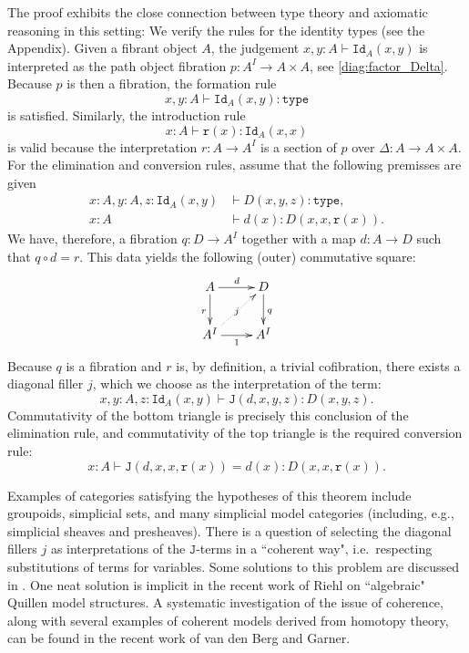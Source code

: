 \documentclass[reqno,12pt]{amsart}
\renewcommand{\to}{\rightarrow}
\newcommand{\type}{\texttt{type}}
\newcommand{\id}[1]{\texttt{Id}_{#1}}
\theoremstyle{definition}
\theoremstyle{remark}
\begin{document}
The proof exhibits the close connection between type theory and axiomatic reasoning in this setting: We verify the rules for the identity types (see the Appendix). Given a fibrant object $A$, the judgement $x, y : A\vdash \id{A}(x, y)$ is interpreted as the path object fibration $p : A^I \to A\times A$, see \eqref{diag:factor_Delta}. Because $p$ is then a fibration, the formation rule
\[
x, y : A\vdash \id{A}(x, y):\type
\]
is satisfied. Similarly, the introduction rule
\[
x:A \vdash \mathtt{r}(x):\id{A}(x,x)
\]
is valid because the interpretation $r : A\to A^I$ is a section of $p$ over $\Delta:A\to A\times A$. For the elimination and conversion rules, assume that the following premisses are given 
\begin{align*}
x : A, y : A, z : \id{A}(x, y) &\vdash D(x, y, z ) : \type , \\
x : A &\vdash d(x) : D(x, x, \mathtt{r}(x)) .
\end{align*}
We have, therefore, a fibration $q : D\to A^I$ together with a map $d : A\to D$ such that 
$q\circ d = r$. This data yields the following (outer) commutative square: 
\[  
\xymatrix{
   A   
    \ar[r]^{d}
    \ar[d]_{r}
    &
   D
    \ar[d]^{q}
    \\
    A^I 
    \ar@{.>}[ru]|{j}
    \ar[r]_{1}
    &
    A^I
  }
\]
 Because $q$ is a fibration and  $r$ is, by definition, a trivial cofibration, there exists a diagonal filler $j$, which we choose
as the interpretation of the term: 
\[
x, y : A, z : \id{A}(x, y) \vdash \mathtt{J}(d, x, y, z ) : D(x, y, z ). 
\]
Commutativity of the bottom triangle is precisely this conclusion of the elimination rule, and commutativity of the top triangle is the required conversion rule:
\[
 x : A \vdash \mathtt{J}(d, x, x, \mathtt{r}(x)) = d(x) : D(x, x, \mathtt{r}(x)).
\] 

Examples of categories satisfying the hypotheses of this theorem include groupoids, simplicial sets, and 
many simplicial model categories \cite{Quillen:HA} (including, e.g., simplicial sheaves and presheaves).  There is a question of selecting the diagonal fillers $j$ as interpretations of the $\mathtt{J}$-terms in a ``coherent way", i.e.\ respecting substitutions of terms for variables.  Some solutions to this problem are discussed in \cite{Awodey:HMIT,Warren:PhD,Garner:CGNWFS}.  One neat solution is implicit in the recent work of Riehl \cite{RiehlAMS} on ``algebraic" Quillen model structures.  A systematic investigation of the issue of coherence, along with several examples of coherent models derived from homotopy theory, can be found in the recent work \cite{vdBG:TSMIT} of van den Berg and Garner.
\end{document}
